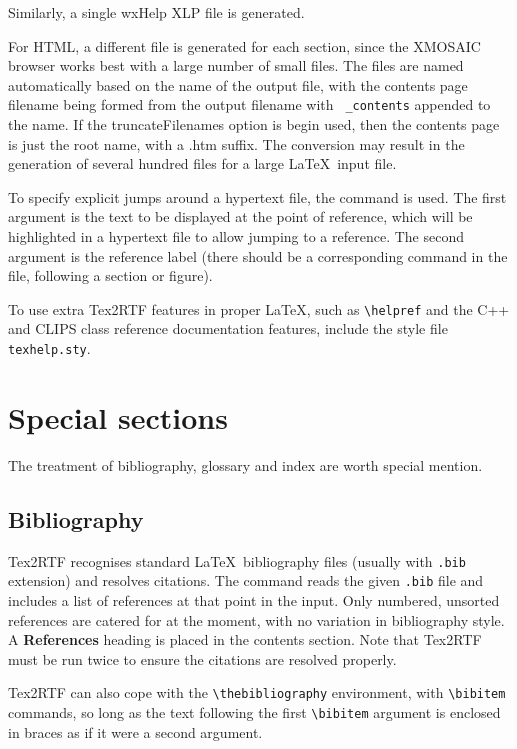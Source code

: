 Similarly, a single wxHelp XLP file is generated.

For HTML, a different file is generated for each section, since the
XMOSAIC browser works best with a large number of small files. The files
are named automatically based on the name of the output file, with the
contents page filename being formed from the output filename with {\tt
\_contents} appended to the name. If the truncateFilenames option is
begin used, then the contents page is just the root name, with a .htm
suffix. The conversion may result in the generation of several hundred
files for a large \LaTeX\  input file. 

To specify explicit jumps around a hypertext file, the  command is
used. The first argument is the text to be displayed at the point of reference,
which will be highlighted in a hypertext file to allow jumping to a reference.
The second argument is the reference label (there should be a corresponding
\rtfsp{} command in the file, following a section or figure).

To use extra Tex2RTF features in proper \LaTeX, such as \verb$\helpref$\rtfsp
and the C++ and CLIPS class reference documentation features, include
the style file {\tt texhelp.sty}.

\section{Special sections}%

The treatment of bibliography, glossary and index are worth special mention.

\subsection{Bibliography}\label{bibsection}%

Tex2RTF recognises standard \LaTeX\ bibliography files (usually with {\tt .bib} extension)
and resolves citations. The \rtfsp
command reads the given {\tt .bib} file and includes a list of
references at that point in the input. Only numbered, unsorted
references are catered for at the moment, with no variation in
bibliography style. A {\bf References} heading is placed in the contents
section. Note that Tex2RTF must be run twice to ensure the citations are
resolved properly.

Tex2RTF can also cope with the \verb$\thebibliography$ environment, with \rtfsp 
\verb$\bibitem$ commands, so long as the text following the first \verb$\bibitem$\rtfsp 
argument is enclosed in braces as if it were a second argument.

